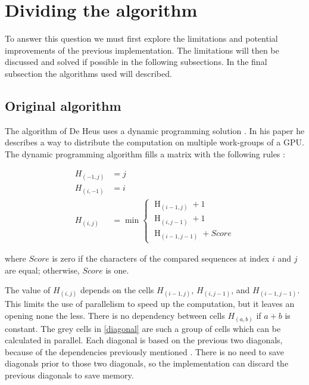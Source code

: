 \section{Dividing the algorithm} \label{q1}
To answer this question we must first explore the limitations and potential improvements of the previous implementation.
The limitations will then be discussed and solved if possible in the following subsections.
In the final subsection the algorithms used will described.

\subsection{Original algorithm} \label{originalalg}
The algorithm of De Heus uses a dynamic programming solution \cite{Heus}.
In his paper he describes a way to distribute the computation on multiple work-groups of a GPU.
The dynamic programming algorithm fills a matrix with the following rules \cite{Jordan}:

\begin{equation} \label{eq1}
\begin{split}
H_{(-1,j)} & = j \\
H_{(i,-1)} & = i \\
H_{(i,j)} & = \min \begin{cases}
          \operatorname{H}_{(i-1,j)} + 1 \\
          \operatorname{H}_{(i,j-1)} + 1 \\
          \operatorname{H}_{(i-1,j-1)} + Score
\end{cases}
\end{split}
\end{equation}

where $Score$ is zero if the characters of the compared sequences at index $i$ and $j$ are equal; otherwise, $Score$ is one.

The value of $H_{(i,j)}$ depends on the cells $H_{(i-1,j)}$, $H_{(i,j-1)}$, and $H_{(i-1,j-1)}$.
This limits the use of parallelism to speed up the computation, but it leaves an opening none the less.
There is no dependency between cells $H_{(a,b)}$ if $a + b$ is constant.
The grey cells in \cref{diagonal} are such a group of cells which can be calculated in parallel.
Each diagonal is based on the previous two diagonals, because of the dependencies previously mentioned \cite{Meyers}.
There is no need to save diagonals prior to those two diagonals, so the implementation can discard the previous diagonals to save memory.


